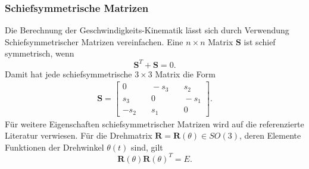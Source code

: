 \subsubsection{Schiefsymmetrische Matrizen}
Die Berechnung der Geschwindigkeits-Kinematik l{\"a}sst sich durch Verwendung Schiefsymmetrischer Matrizen vereinfachen. Eine $n\times n$ Matrix $\bm{S}$ ist schief symmetrisch, wenn 
\begin{equation}
	\label{eqn:skewsymmetric}
	\bm{S}^T+\bm{S}=0.
\end{equation}
Damit hat jede schiefsymmetrische $3\times3$ Matrix die Form
\begin{align}
	\bm{S} = \left[\begin{matrix}
		0 &\quad -s_3 &\quad s_2  \\
		s_3 &\quad 0 &\quad -s_1  \\
		-s_2 &\quad s_1 &\quad 0  
	\end{matrix}\right].
\end{align}
Für weitere Eigenschaften schiefsymmetrischer Matrizen wird auf die referenzierte Literatur \cite[S.~104]{Spong.2020} verwiesen. Für die Drehmatrix $\bm{R} = \bm{R}(\theta) \in SO(3)$, deren Elemente Funktionen der Drehwinkel $\theta\left(t\right)$ sind, gilt 
\begin{equation}
	\label{eqn:einheitsmatrix}
	\bm{R}(\theta)\bm{R}(\theta)^T = E.
\end{equation}
%
